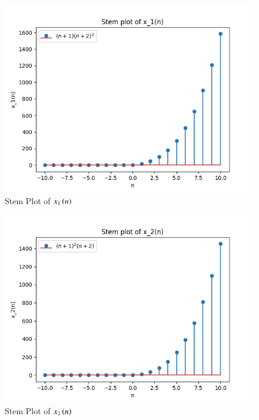 \documentclass[journal,12pt,twocolumn]{IEEEtran}
\theoremstyle{remark}
\begin{document}
\begin{figure}[htbp]
    \centering
    \includegraphics[width=1\columnwidth]{x1_plot.png}
    \caption{Stem Plot of $x_1\left(n\right)$}
    \label{fig:x1}
\end{figure}

\begin{figure}[htbp]
    \centering
    \includegraphics[width=1\columnwidth]{x2_plot.png}
    \caption{Stem Plot of $x_2\left(n\right)$}
    \label{fig:x2}
\end{figure}
\end{document}
